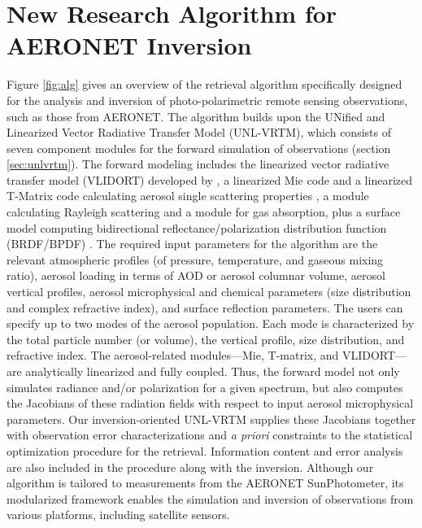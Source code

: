 \section{New Research Algorithm for AERONET Inversion}

Figure \ref{fig:alg} gives an overview of the retrieval algorithm specifically
designed for the analysis and inversion of photo-polarimetric remote
sensing observations, such as those from AERONET. The algorithm builds
upon the UNified and Linearized Vector Radiative Transfer Model
(UNL-VRTM), which consists of seven component modules for the forward
simulation of observations (section \ref{sec:unlvrtm}). The forward 
modeling includes the linearized vector
radiative transfer model (VLIDORT) developed by \citet{Spurr06}, a
linearized Mie code and a linearized T-Matrix code calculating aerosol
single scattering properties \citep{Spurr12}, a module calculating
Rayleigh scattering and a module for gas absorption, plus a surface
model computing bidirectional reflectance/polarization distribution
function (BRDF/BPDF) \citep{Spurr04}. The required input parameters for
the algorithm are the relevant atmospheric profiles (of pressure,
temperature, and gaseous mixing ratio), aerosol loading in terms of AOD
or aerosol columnar volume, aerosol vertical profiles, aerosol
microphysical and chemical parameters (size distribution and complex
refractive index), and surface reflection parameters. The users can
specify up to two modes of the aerosol population. Each mode is
characterized by the total particle number (or volume), the vertical
profile, size distribution, and refractive index. The aerosol-related
modules---Mie, T-matrix, and VLIDORT---are analytically linearized and fully
coupled. Thus, the forward model not only simulates radiance and/or
polarization for a given spectrum, but also computes the Jacobians of
these radiation fields with respect to input aerosol microphysical
parameters. Our inversion-oriented UNL-VRTM supplies these Jacobians
together with observation error characterizations and \textit{a priori}
constraints to the statistical optimization procedure for the retrieval.
Information content and error analysis are also included in the
procedure along with the inversion. Although our algorithm is tailored
to measurements from the AERONET SunPhotometer, its modularized
framework enables the simulation and inversion of observations from
various platforms, including satellite sensors. 

